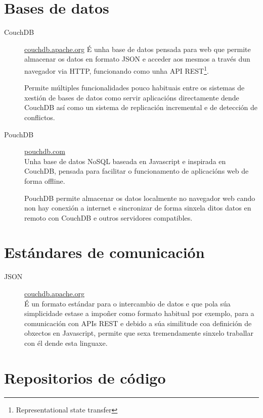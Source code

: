   \section{Bases de datos}

  \begin{description}

     \item [CouchDB] \href{http://couchdb.apache.org/}{couchdb.apache.org} É 
unha base de datos 
pensada para web que permite almacenar 
os datos en formato JSON e acceder aos mesmos a través dun navegador via HTTP, 
funcionando como unha API REST\footnote{Representational state 
transfer}.

  Permite múltiples funcionalidades pouco habituais entre os sistemas de 
xestión de bases de datos como servir aplicacións directamente dende 
CouchDB así como un sistema de replicación incremental e de detección de 
conflictos.

     \item [PouchDB] \href{https://pouchdb.com/}{pouchdb.com}\\ Unha base de 
datos NoSQL 
baseada en Javascript e inspirada 
en CouchDB, pensada para facilitar o funcionamento de aplicacións web de forma 
offline.

PouchDB permite almacenar os datos localmente no navegador web cando non 
hay conexión a internet e sincronizar de forma sinxela ditos datos en remoto con 
CouchDB e outros servidores compatibles.%

  \end{description}

  \section{Estándares de comunicación}

  \begin{description}
   \item [JSON] \href{http://couchdb.apache.org/}{couchdb.apache.org}\\ É un 
formato estándar para o 
intercambio de datos e que pola súa 
simplicidade estase a impoñer como formato habitual por exemplo, para a comunicación con 
APIs REST e debido a súa similitude coa definición de obxectos en Javascript, 
permite que 
sexa tremendamente sinxelo traballar con él dende esta linguaxe.
  \end{description}

  \section{Repositorios de código}

